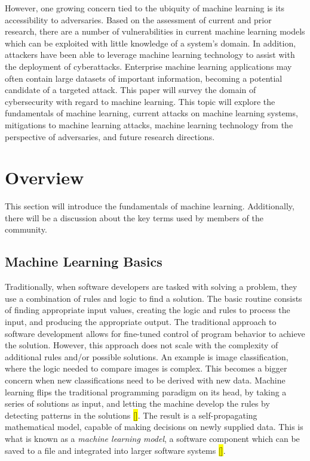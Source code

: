 \documentclass[11pt,conference]{IEEEtran}
\begin{document}
However, one growing concern tied to the ubiquity of machine learning is its 
accessibility to adversaries. Based on the assessment of current and prior
research, there are a number of vulnerabilities in current machine learning
models which can be exploited with little knowledge of a system's domain. In
addition, attackers have been able to leverage machine learning technology to
assist with the deployment of cyberattacks. Enterprise machine learning applications
may often contain large datasets of important information, becoming a potential 
candidate of a targeted attack. This paper will survey the domain of
cybersecurity with regard to machine learning. This topic will explore the
fundamentals of machine learning, current attacks on machine learning
systems, mitigations to machine learning attacks, machine learning technology from the perspective of adversaries, and
future research directions.

\section{Overview}
This section will introduce the fundamentals of machine learning. Additionally,
there will be a discussion about the key terms used by members of the community.

\subsection{Machine Learning Basics}
Traditionally, when software developers are tasked with solving a problem, they
use a combination of rules and logic to find a solution. The basic
routine consists of finding appropriate input values,
creating the logic and rules to process the input, and producing the appropriate output.
The traditional approach to software development allows for fine-tuned control
of program behavior to achieve the solution. However, this approach does not scale
with the complexity of additional rules and/or possible solutions. An
example is image classification, where the logic needed to compare images
is complex. This becomes a bigger concern when new classifications need to be
derived with new data. Machine learning flips the traditional programming
paradigm on its head, by taking a series of solutions as input, and
letting the machine develop the rules by detecting patterns in the solutions
\hl{[]}.
The result is a self-propagating mathematical model, capable of making
decisions on newly supplied data. This is what is known as a \emph{machine
learning model}, a software component which can be saved to a file and
integrated into larger software systems \hl{[]}.
\end{document}
